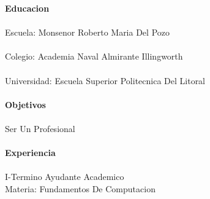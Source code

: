 \begin{tabbing}
{\large \bf Educacion}                                         \\ \\

\> Escuela:             \> Monsenor Roberto Maria Del Pozo                           \\ \\
\> Colegio:             \> Academia Naval Almirante  Illingworth                                     \\ \\
\> Universidad:      \> Escuela Superior Politecnica Del Litoral                                   \\ \\

{\large \bf Objetivos}                                         \\ \\

\>                      \> Ser Un Profesional                       \\ \\


{\large \bf Experiencia}                                                     \\ \\

 I-Termino      \> Ayudante Academico                  \\
\>                          \> {Materia: Fundamentos De Computacion}                      \\ \\

\end{tabbing}



